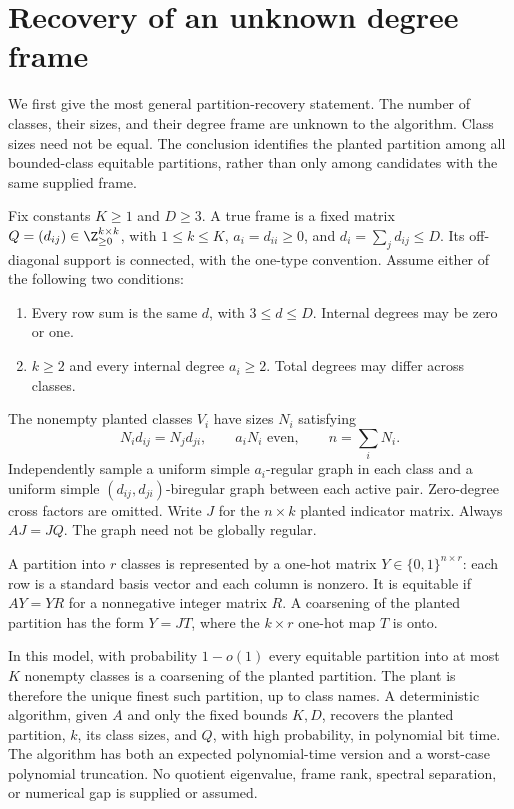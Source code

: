 \section{Recovery of an unknown degree frame}\label{sec:unknown-frame}

We first give the most general partition-recovery statement. The number
of classes, their sizes, and their degree frame are unknown to the
algorithm. Class sizes need not be equal. The conclusion identifies
the planted partition among all bounded-class equitable partitions,
rather than only among candidates with the same supplied frame.

Fix constants $K\ge1$ and $D\ge3$. A true frame is a fixed matrix
$Q=(d_{ij})\in\Z_{\ge0}^{k\times k}$, with $1\le k\le K$,
$a_i=d_{ii}\ge0$, and $d_i=\sum_jd_{ij}\le D$.
Its off-diagonal support is connected, with the one-type convention.
Assume either of the following two conditions:
\begin{enumerate}
 \item Every row sum is the same $d$, with $3\le d\le D$.
       Internal degrees may be zero or one.
 \item $k\ge2$ and every internal degree $a_i\ge2$.
       Total degrees may differ across classes.
\end{enumerate}
The nonempty planted classes
$V_i$ have sizes $N_i$ satisfying
\begin{equation}\label{eq:unknown-balance}
 N_id_{ij}=N_jd_{ji},\qquad a_iN_i\text{ even},\qquad
 n=\sum_iN_i.
\end{equation}
Independently sample a uniform simple $a_i$-regular graph in each
class and a uniform simple $(d_{ij},d_{ji})$-biregular graph between
each active pair. Zero-degree cross factors are omitted. Write $J$
for the $n\times k$ planted indicator matrix. Always $AJ=JQ$.
The graph need not be globally regular.

A partition into $r$ classes is represented by a one-hot matrix
$Y\in\{0,1\}^{n\times r}$: each row is a standard basis vector and
each column is nonzero. It is equitable if $AY=YR$ for a nonnegative
integer matrix $R$. A coarsening of the planted partition has the form
$Y=JT$, where the $k\times r$ one-hot map $T$ is onto.

\begin{theorem}\label{thm:unknown-frame}
In this model, with probability $1-o(1)$ every equitable partition
into at most $K$ nonempty classes is a coarsening of the planted
partition. The plant is therefore the unique finest such partition,
up to class names. A deterministic algorithm, given $A$ and only
the fixed bounds $K,D$, recovers the planted partition, $k$, its
class sizes, and $Q$, with high probability, in polynomial bit time.
The algorithm has both an expected polynomial-time version and a
worst-case polynomial truncation. No quotient eigenvalue, frame rank,
spectral separation, or numerical gap is supplied or assumed.
\end{theorem}

